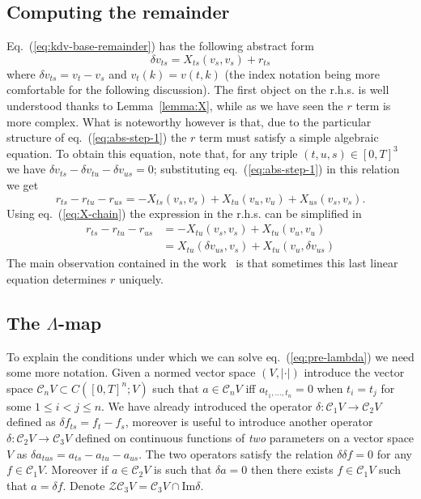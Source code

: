 \documentclass[a4paper,12pt,reqno]{article}
\newcommand{\der}{\delta}
\newcommand{\CC}{\mathcal{C}}
\newcommand{\cZ}{\mathcal{Z}}
\begin{document}
\subsection{Computing the remainder}

Eq.~(\ref{eq:kdv-base-remainder}) has the following abstract form
\begin{equation}
  \label{eq:abs-step-1}
\der v_{ts}  = X_{ts}(v_s,v_s) + r_{ts}  
\end{equation}
where $\der v_{ts} = v_t - v_s$ and $v_t(k) = v(t,k)$ (the index
notation being more comfortable for the following discussion). The
first object on the r.h.s. is well understood thanks to
Lemma~\ref{lemma:X}, while as we have seen the $r$ term is more
complex. What is noteworthy however is that, due to the particular
structure of eq.~(\ref{eq:abs-step-1}) the $r$ term must satisfy a simple
algebraic equation. To obtain this equation, note that, for any triple
$(t,u,s) \in [0,T]^3$ we have
$
\der v_{ts} - \der v_{tu} - \der v_{us} = 0
$; substituting eq.~(\ref{eq:abs-step-1}) in this relation we get
$$
 r_{ts} -
r_{tu} - r_{us}   = 
- X_{ts}(v_s,v_s) + X_{tu}(v_u,v_u) + X_{us}(v_s,v_s).   
$$
Using eq.~(\ref{eq:X-chain}) the expression in the r.h.s. can be
simplified in
\begin{equation}
\label{eq:pre-lambda}
  \begin{split}
 r_{ts} -
r_{tu} - r_{us}  & = 
- X_{tu}(v_s,v_s) + X_{tu}(v_u,v_u)   
    \\  & = 
 X_{tu}(\der v_{us},v_s) + X_{tu}(v_u,\der v_{us})   
  \end{split}
\end{equation}
The main observation contained in the work~\cite{MR2091358} is that  sometimes this
last linear equation determines $r$ uniquely.


\subsection{The $\Lambda$-map}
To explain the conditions under which we can solve
eq.~(\ref{eq:pre-lambda}) we need some more notation. 
Given a normed vector space $(V,|\cdot|)$ introduce the vector space
$\CC_n V \subset C([0,T]^n;V)$ such that $a \in \CC_n V$ iff $ a_{t_1, \dots,t_n} = 0$ when $t_i
  = t_j$ for some $1 \le i < j \le n$. We have already introduced the
  operator $\der : \CC_1 V \to \CC_2 V$ defined as $\der f_{ts} = f_t
  - f_s$, moreover is useful to introduce
another operator $\der : \CC_2 V \to \CC_3 V$ defined on
continuous functions of \emph{two} parameters 
on a vector space $V$ as
$ \der a_{tus} = a_{ts} - a_{tu} - a_{us} $. The two operators satisfy
the relation $\der \der f = 0$ for any $f \in \CC_1 V$. Moreover if $a
\in \CC_2 V$ is such that $\der a = 0$ then  there exists $f \in \CC_1 V$ such that $ a = \der f$. Denote
$\cZ \CC_3 V = \CC_3 V \cap \text{Im} \der$.
\end{document}
